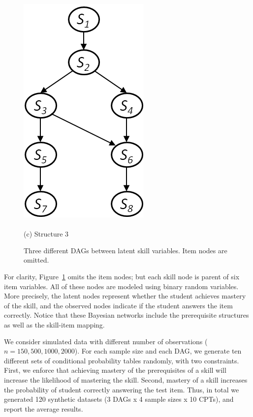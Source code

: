 \documentclass{edm_template}
\begin{document}
{\begin{figure}[!ht]
\begin{minipage}[b]{0.45\linewidth}
			\includegraphics[width=0.7\linewidth]{figures/model3.png}\\~\\
			(c) Structure 3
		\end{minipage}	
		\caption{Three different DAGs between latent skill variables.  Item nodes are omitted.}
		\label{fig:syn-nets}
	\end{figure} 
	
	For clarity, Figure~\ref{fig:syn-nets}  omits the item nodes;
	but each skill node is parent of six item variables.
	All of these nodes are modeled using binary random variables.
	More precisely, the latent  nodes represent whether the student  achieves mastery of the skill,
	and the observed nodes indicate if the student answers the item correctly.
	Notice that these Bayesian networks include the prerequisite structures as well as the skill-item mapping.
	
	We consider simulated data with different number of observations ($n=150, 500, 1000, 2000$).
	For each sample size and each  DAG, we generate ten different sets of conditional probability tables
	randomly, with two  constraints.
	First, we enforce that achieving mastery of the prerequisites of a skill will increase the likelihood of mastering the skill.
	Second, mastery of a skill increases the probability of student correctly answering the test item. 
	Thus, in total we generated 120 synthetic datasets (3 DAGs x 4 sample sizes x 10 CPTs), and  report the average results.
	
}
\end{document}

